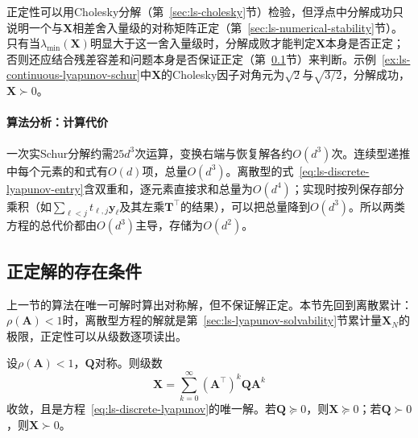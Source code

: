正定性可以用Cholesky分解（第~\ref{sec:ls-cholesky}节）检验，但浮点中分解成功只说明一个与$\bm X$相差舍入量级的对称矩阵正定（第~\ref{sec:ls-numerical-stability}节）。只有当$\lambda_{\min}(\bm X)$明显大于这一舍入量级时，分解成败才能判定$\bm X$本身是否正定；否则还应结合残差容差和问题本身是否保证正定（第~\ref{sec:ls-lyapunov-positivity}节）来判断。示例~\ref{ex:ls-continuous-lyapunov-schur}中$\bm X$的Cholesky因子对角元为$\sqrt2$与$\sqrt{3/2}$，分解成功，$\bm X\succ0$。

\paragraph{算法分析：计算代价}
一次实Schur分解约需$25d^3$次运算，变换右端与恢复解各约$O(d^3)$次。连续型递推中每个元素的和式有$O(d)$项，总量$O(d^3)$。离散型的式~\eqref{eq:ls-discrete-lyapunov-entry}含双重和，逐元素直接求和总量为$O(d^4)$；实现时按列保存部分乘积（如$\sum_{\ell<j}t_{\ell,j}\bm y_\ell$及其左乘$\bm T^\top$的结果），可以把总量降到$O(d^3)$。所以两类方程的总代价都由$O(d^3)$主导，存储为$O(d^2)$。

\subsection{正定解的存在条件}
\label{sec:ls-lyapunov-positivity}

上一节的算法在唯一可解时算出对称解，但不保证解正定。本节先回到离散累计：$\rho(\bm A)<1$时，离散型方程的解就是第~\ref{sec:ls-lyapunov-solvability}节累计量$\bm X_N$的极限，正定性可以从级数逐项读出。

\begin{theorem}[离散型Lyapunov方程的级数解]
\label{thm:ls-discrete-lyapunov-series}
设$\rho(\bm A)<1$，$\bm Q$对称。则级数
\begin{equation}
 \bm X=\sum_{k=0}^{\infty}(\bm A^\top)^k\bm Q\bm A^k
 \label{eq:ls-discrete-lyapunov-series}
\end{equation}
收敛，且是方程~\eqref{eq:ls-discrete-lyapunov}的唯一解。若$\bm Q\succeq0$，则$\bm X\succeq0$；若$\bm Q\succ0$，则$\bm X\succ0$。
\end{theorem}

